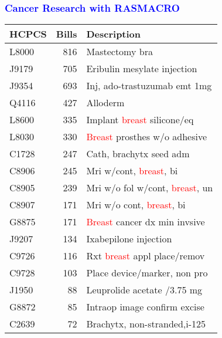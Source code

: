 \documentclass[11pt,pdftex,dvipsnames,usenames]{beamer}
\begin{document}
\begin{frame}[fragile]\frametitle{\bf\textcolor{blue}{Cancer Research with RASMACRO}}

\begin{center}
\begin{tabular}{lr|l}
HCPCS & Bills & Description \\ \hline
L8000 &      816  &     Mastectomy bra                  \\
J9179 &      705  &     Eribulin mesylate injection     \\
J9354 &      693  &    Inj, ado-trastuzumab emt 1mg    \\
Q4116 &      427  &    Alloderm                        \\
L8600 &      335  &    Implant \textcolor{red}{breast} silicone/eq      \\
L8030 &      330  &    \textcolor{red}{Breast} prosthes w/o adhesive    \\
C1728 &      247  &    Cath, brachytx seed adm         \\
C8906 &      245  &    Mri w/cont, \textcolor{red}{breast},  bi         \\
C8905 &      239  &    Mri w/o fol w/cont, \textcolor{red}{breast}, un    \\
C8907 &      171  &    Mri w/o cont, \textcolor{red}{breast}, bi        \\
G8875 &      171  &    \textcolor{red}{Breast} cancer dx min invsive    \\
J9207 &      134  &    Ixabepilone injection           \\
C9726 &      116  &    Rxt \textcolor{red}{breast} appl place/remov     \\
C9728 &      103  &    Place device/marker, non pro    \\
J1950 &       88  &    Leuprolide acetate /3.75 mg     \\
G8872 &       85  &    Intraop image confirm excise    \\
C2639 &       72  &    Brachytx, non-stranded,i-125    
\end{tabular}
\end{center}

\end{frame}
\end{document}
